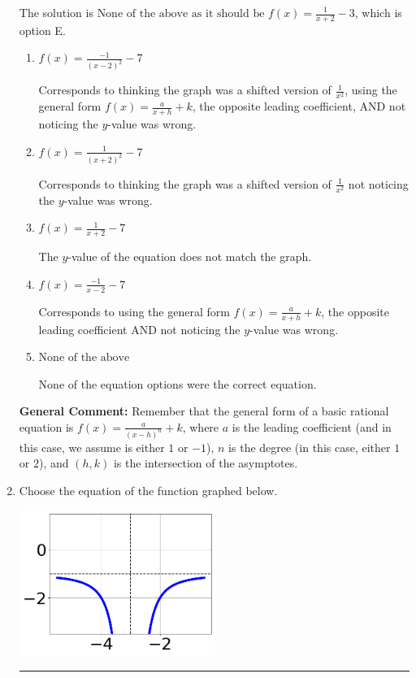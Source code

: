 \documentclass{extbook}[14pt]
\newcommand{\litem}[1]{\item #1

\rule{\textwidth}{0.4pt}}
\begin{document}
\begin{enumerate}
{The solution is \( \text{None of the above as it should be } f(x) = \frac{1}{x + 2} - 3 \), which is option E.\begin{enumerate}[label=\Alph*.]
\item \( f(x) = \frac{-1}{(x - 2)^2} - 7 \)

Corresponds to thinking the graph was a shifted version of $\frac{1}{x^2}$, using the general form $f(x) = \frac{a}{x+h}+k$, the opposite leading coefficient, AND not noticing the $y$-value was wrong.
\item \( f(x) = \frac{1}{(x + 2)^2} - 7 \)

Corresponds to thinking the graph was a shifted version of $\frac{1}{x^2}$ not noticing the $y$-value was wrong.
\item \( f(x) = \frac{1}{x + 2} - 7 \)

The $y$-value of the equation does not match the graph.
\item \( f(x) = \frac{-1}{x - 2} - 7 \)

Corresponds to using the general form $f(x) = \frac{a}{x+h}+k$, the opposite leading coefficient AND not noticing the $y$-value was wrong.
\item \( \text{None of the above} \)

None of the equation options were the correct equation.
\end{enumerate}

\textbf{General Comment:} Remember that the general form of a basic rational equation is $ f(x) = \frac{a}{(x-h)^n} + k$, where $a$ is the leading coefficient (and in this case, we assume is either $1$ or $-1$), $n$ is the degree (in this case, either $1$ or $2$), and $(h, k)$ is the intersection of the asymptotes.
}
\litem{
Choose the equation of the function graphed below.

\begin{center}
    \includegraphics[width=0.5\textwidth]{../Figures/rationalGraphToEquationA.png}
\end{center}




}
\end{enumerate}
\end{document}
